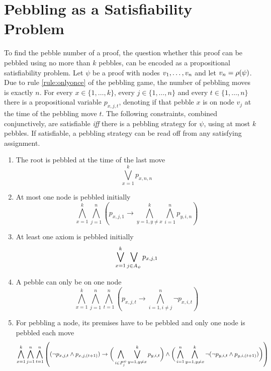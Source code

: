 \documentclass{llncs}
\begin{document}
\section{Pebbling as a Satisfiability Problem}
\label{sec:PebblingAsSat}

To find the pebble number of a proof, the question whether this proof can be pebbled using no more than $k$ pebbles, can be encoded as a propositional satisfiability problem.
Let $\psi$ be a proof with nodes $v_1,\ldots,v_n$ and let $v_n = \rho(\psi)$. 
Due to rule \ref{rule:onlyonce} of the pebbling game, the number of pebbling moves is exactly $n$. For every $x \in \{1,\ldots,k\}$, every $j \in \{1,\ldots,n\}$ and every $t \in \{1,\ldots,n\}$ there is a propositional variable $p_{x,j,t}$, denoting if that pebble $x$ is on node $v_j$ at the time of the pebbling move $t$. The following constraints, combined conjunctively, are satisfiable \textit{iff} there is a pebbling strategy for $\psi$, using at most $k$ pebbles. If satisfiable, a pebbling strategy can be read off from any satisfying assignment.

\begin{enumerate}
	\item The root is pebbled at the time of the last move
				$$\bigvee_{x = 1}^k p_{x,n,n}$$
				
	\item At most one node is pebbled initially\\
				$$\bigwedge_{x = 1}^k \bigwedge_{j = 1}^n \left( p_{x,j,1} \rightarrow \bigwedge_{y = 1, y \neq x}^k \bigwedge_{i = 1}^n p_{y,i,n} \right)$$
	
	\item At least one axiom is pebbled initially\\
				$$\bigvee_{x = 1}^k \bigvee_{j \in A_{\psi}} p_{x,j,1}$$
				
	\item A pebble can only be on one node
				$$\bigwedge_{x = 1}^k \bigwedge_{j = 1}^n \bigwedge_{t = 1}^n \left( p_{x,j,t} \rightarrow \bigwedge_{i = 1, i \neq j}^n \neg p_{x,i,t} \right)$$ 
				
	\item \label{c:pebble} For pebbling a node, its premises have to be pebbled and only one node is pebbled each move\\
				$$\bigwedge_{x = 1}^k \bigwedge_{j = 1}^n \bigwedge_{t = 1}^n \left( (\neg p_{x,j,t} \wedge p_{x,j,(t+1)} ) \rightarrow 
					\bigg( \bigwedge_{i \in P_{j}^{\psi}} \bigvee_{y = 1, y \neq x}^k p_{y,i,t} \bigg) \wedge 
					\bigg( \bigwedge_{i = 1}^n \bigwedge_{y = 1, y \neq x}^k \neg ( \neg p_{y,i,t} \wedge p_{y,i,(t+1)} ) \bigg) \right)$$
				
\end{enumerate}
\end{document}
